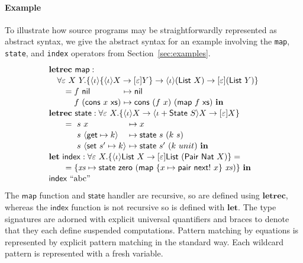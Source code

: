 \documentclass[12pt]{article}
\makeatletter
\newcommand\ba{\begin{array}}
\newcommand\ea{\end{array}}
\newcommand{\bl}{\ba[t]{@{}l@{}}}
\newcommand{\el}{\ea}
\newcommand{\key}[1]{\textbf{#1}} %
\newcommand{\var}{\mathit}        %
\newcommand{\op}{\mathsf}  %
\newcommand{\con}{\mathsf} %
\newcommand{\inter}{\mathsf} %
\newcommand{\str}[1]{\textrm{``#1''}} %
\newcommand{\thunk}[1]{\{{#1}\}}
\newcommand{\evd}{\varepsilon}
\newcommand{\effin}[1]{\langle {#1} \rangle}
\newcommand{\effout}[1]{[{#1}]}
\newcommand{\id}{\iota}
\makeatother
\begin{document}
\paragraph{Example}
To illustrate how source programs may be straightforwardly represented
as abstract syntax, we give the abstract syntax for an example
involving the \verb!map!, \verb!state!, and \verb!index!  operators
from Section~\ref{sec:examples}.
%
\[
\def\arraystretch{1.1}
\bl
\key{letrec}~\op{map} : \\
\quad
   \forall \evd~X~Y.
      \thunk{\effin{\id}\thunk{\effin{\id}X \to \effout{\evd}Y}
               \to \effin{\id}(\con{List}~X) \to \effout{\evd}(\con{List}~Y)} \\
\qquad =
       \ba[t]{@{}r@{}l@{}l@{}}
                           & f~\con{nil}               &~\mapsto \con{nil} \\
                           & f~(\con{cons}~x~\con{xs}) &~\mapsto \con{cons}~(f~x)~(\op{map}~f~\con{xs}) ~\key{in} \\
       \ea \\
\key{letrec}~\op{state} : \forall \evd~X.\thunk{\effin{\id}X \to \effin{\id + \inter{State}~S}X \to \effout{\evd}X} \\
\qquad =
     \ba[t]{@{}r@{~}l@{~}l@{~}l@{}}
              & s & x &\mapsto x \\
              & s & \effin{\op{get} \mapsto k} &\mapsto \op{state}~s~(k~s) \\
              & s & \effin{\op{set}~s' \mapsto k} &\mapsto \op{state}~s'~(k~unit)~\key{in} \\
     \ea \\
\key{let}~\op{index} : \forall \evd~X.\thunk{\effin{\id}\con{List}~X \to \effout{\evd}\con{List}~(\con{Pair}~\con{Nat}~X)} = \\
\qquad =
    \{                      \var{xs} \mapsto \op{state}~\con{zero}~(\op{map}~\thunk{x \mapsto \op{pair}~\op{next}!~x}~\var{xs})\}~\key{in} \\
\op{index}~\str{abc} \\
\el
\]
%
The $\op{map}$ function and $\op{state}$ handler are recursive, so are
defined using $\key{letrec}$, whereas the $\op{index}$ function is not
recursive so is defined with $\key{let}$. The type signatures are
adorned with explicit universal quantifiers and braces to denote that
they each define suspended computations. Pattern matching by equations
is represented by explicit pattern matching in the standard way. Each
wildcard pattern is represented with a fresh variable.
\end{document}
